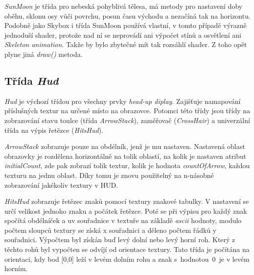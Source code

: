 \emph{SunMoon} je třída pro nebeská pohyblivá tělesa, má metody pro nastavení doby oběhu, sklonu osy vůči povrchu, posun času východu a nezačíná tak na horizontu. Podobně jako Skybox i třída SunMoon používá vlastní, v tomto případě výrazně jednoduší shader, protože nad ní se neprovádí ani  výpočet stínů a osvětlení ani \emph{Skeleton animation}. Takže by bylo zbytečné mít tak rozsáhlí shader. Z toho opět plyne jiná \emph{draw()} metoda.        
\subsection{Třída \emph{Hud}}   
\emph{Hud} je výchozí třídou pro všechny prvky \emph{head-up diplay}. Zajišťuje namapování příslušných textur na určené místo na obrazovce. Potomci této třídy  jsou třídy na zobrazování stavu toulce (třída \emph{ArrowStack}), zaměřovač (\emph{CrossHair}) a univerzální třída na výpis řetězce (\emph{HitsHud}).

\emph{ArrowStack} zobrazuje pouze na obdélník, jenž je mu nastaven. Nastavená oblast obrazovky je rozdělena horizontálně na tolik oblastí, na kolik je nastaven atribut \emph{initialCount}, zde pak zobrazí tolik textur, kolik je hodnota \emph{countOfArrow}, každou texturu na jednu oblast. Díky tomu je znovu použitelný na n-násobné zobrazování jakékoliv textury v HUD.
 
\emph{HitsHud} zobrazuje řetězec znaků pomocí textury znakové tabulky. V nastavení se určí velikost jednoho znaku a počátek řetězce. Poté se při výpisu pro každý znak spočítá obdélníček a uv souřadnice v textuře na základě \emph{ascii} hodnoty, modulo počtem sloupců textury se získá x souřadnici a děleno počtem řádků y souřadnici. Výpočtem byl získán buď levý dolní nebo levý horní roh. Který z těchto rohů byl vypočten se odvíjí od orientace textury. Tato třída je počítána na orientaci, kdy bod [0,0] leží v levém dolním rohu a znak s~hodnotou~0~je v levém horním.  
